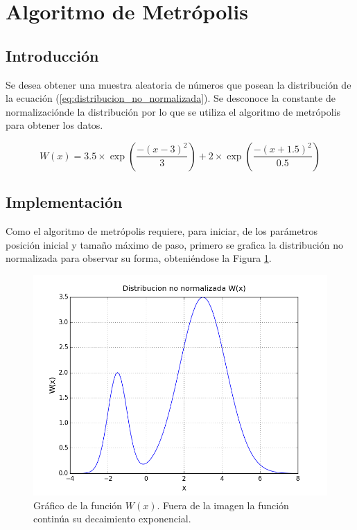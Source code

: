 \documentclass{article}
\begin{document}
\section{Algoritmo de Metrópolis}

\subsection{Introducción}

Se desea obtener una muestra aleatoria de números que posean la distribución de la ecuación (\ref{eq:distribucion_no_normalizada}). Se desconoce la constante de normalizaciónde la distribución por lo que se utiliza el algoritmo de metrópolis para obtener los datos.

\begin{equation}
  W(x) = 3.5 \times \exp\left({\frac{-(x-3)^2}{3}}\right) + 2 \times \exp{\left(\frac{-(x+1.5)^2}{0.5}\right)}
  \label{eq:distribucion_no_normalizada}
\end{equation}

\subsection{Implementación}

Como el algoritmo de metrópolis requiere, para iniciar, de los parámetros posición inicial y tamaño máximo de paso, primero se grafica la distribución no normalizada para observar su forma, obteniéndose la Figura \ref{fig:distribucion_no_norm}.

\begin{figure}[ht]
  \centering
  \includegraphics[scale = 0.5]{images/distribucion_no_normalizada.png}
  \caption{Gráfico de la función $W(x)$. Fuera de la imagen la función continúa su decaimiento exponencial.}
  \label{fig:distribucion_no_norm}
\end{figure}
\end{document}
